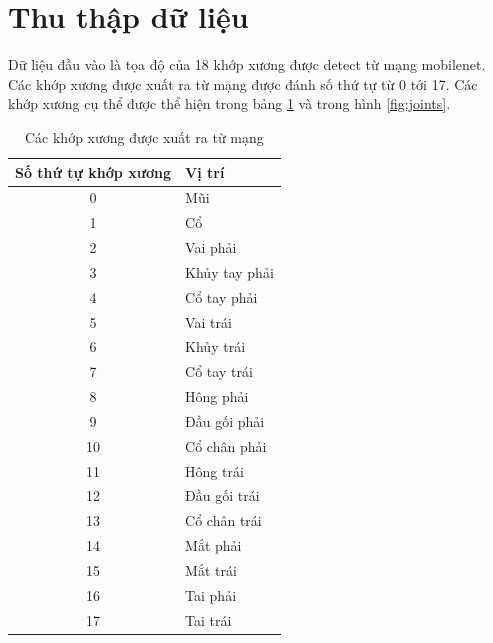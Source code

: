 \section{Thu thập dữ liệu}
Dữ liệu đầu vào là tọa độ của 18 khớp xương được detect từ mạng mobilenet. Các khớp xương được xuất ra từ mạng được đánh số thứ tự từ 0 tới 17. Các khớp xương cụ thể được thể hiện trong bảng \ref{table:joints} và trong hình \ref{fig:joints}.


\begin{table}[h]
\caption{Các khớp xương được xuất ra từ mạng}
\label{table:joints}
\centering
\begin{center}
\begin{tabular}{|c|p{9cm}|} 
 \hline
Số thứ tự khớp xương  & Vị trí \\
 \hline
 0 & Mũi\\
 \hline 
 1 & Cổ\\
 \hline 
 2 & Vai phải\\
 \hline
 3 & Khủy tay phải \\
 \hline 
 4 & Cổ tay phải\\
 \hline
 5 & Vai trái\\
 \hline
 6 & Khủy trái\\
 \hline
 7 & Cổ tay trái\\
 \hline
 8 & Hông phải\\
 \hline
 9 & Đầu gối phải\\
 \hline
 10 & Cổ chân phải\\
 \hline
 11 & Hông trái\\
 \hline
 12 & Đầu gối trái\\
 \hline
 13 & Cổ chân trái\\
 \hline
 14 & Mắt phải\\
 \hline
 15 & Mắt trái\\
 \hline
 16 & Tai phải\\
 \hline
 17 & Tai trái\\
 \hline
\end{tabular}
\end{center}
\end{table}

